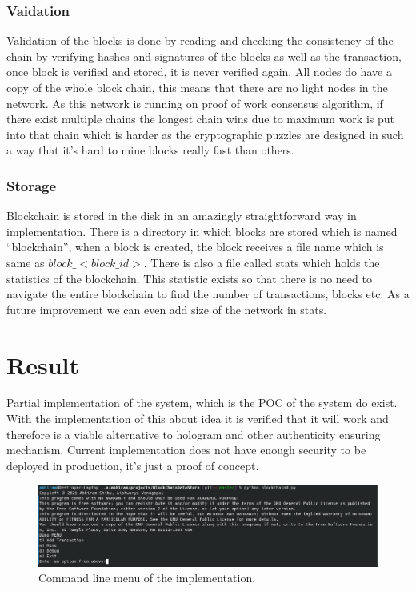 \documentclass[conference]{IEEEtran}
\begin{document}
\subsubsection{Vaidation}
Validation of the blocks is done by reading and checking the consistency of the chain by verifying hashes and signatures of the blocks as well as the transaction, once block is verified and stored, it is never verified again. All nodes do have a copy of the whole block chain, this means that there are no light nodes in the network. As this network is running on proof of work consensus algorithm, if there exist multiple chains the longest chain wins due to maximum work is put into that chain which is harder as the cryptographic puzzles are designed in such a way that it's hard to mine blocks really fast than others. 

\subsubsection{Storage}
Blockchain is stored in the disk\cite{b2} in an amazingly straightforward way in implementation. There is a directory in which blocks are stored which is named “blockchain”, when a block is created, the block receives a file name which is same as $block\_<block\_id>$. There is also a file called stats which holds the statistics of the blockchain. This statistic exists so that there is no need to navigate the entire blockchain to find the number of transactions, blocks etc. As a future improvement we can even add size of the network in stats.
\section{Result}
Partial implementation of the system, which is the POC of the system do exist. With the implementation of this about idea it is verified that it will work and therefore is a viable alternative to hologram and other authenticity ensuring mechanism. Current implementation does not have enough security  to be deployed in production, it's just a proof of concept.
\begin{figure}[h]
	\centering
	\includegraphics[width=0.7\linewidth]{Menu}
	\caption{Command line menu of the implementation.}
	\label{fig:menu}
\end{figure}
\end{document}

